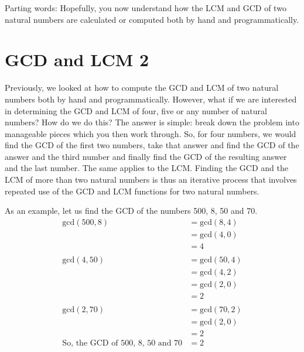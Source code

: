 \documentclass[
]{book}
\begin{document}
Parting words: Hopefully, you now understand how the LCM and GCD of two natural numbers are calculated or computed both by hand and programmatically.

\chapter{GCD and LCM 2}\label{gcd-and-lcm-2}

Previously, we looked at how to compute the GCD and LCM of two natural numbers both by hand and programmatically. However, what if we are interested in determining the GCD and LCM of four, five or any number of natural numbers? How do we do this? The answer is simple: break down the problem into manageable pieces which you then work through. So, for four numbers, we would find the GCD of the first two numbers, take that answer and find the GCD of the answer and the third number and finally find the GCD of the resulting answer and the last number. The same applies to the LCM. Finding the GCD and the LCM of more than two natural numbers is thus an iterative process that involves repeated use of the GCD and LCM functions for two natural numbers.

As an example, let us find the GCD of the numbers 500, 8, 50 and 70.
\[
\begin{aligned}
\text{gcd}(500, 8) &= \text{gcd}(8, 4)  \\
 &= \text{gcd}(4, 0) \\
 &= 4 \\
 \\
\text{gcd}(4, 50) &= \text{gcd}(50, 4) \\
 &= \text{gcd}(4, 2) \\
 &= \text{gcd}(2, 0) \\
 &= 2 \\
 \\
\text{gcd}(2, 70) &= \text{gcd}(70, 2) \\
 &= \text{gcd}(2, 0) \\
 &= 2 \\
\text{So, the GCD of 500, 8, 50 and 70} &= 2
\end{aligned}
\]
\end{document}
